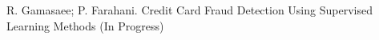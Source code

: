 





    


\begin{cvpublications}

  \cvpublication
    {R. Gamasaee; P. Farahani.} %
    {Credit Card Fraud Detection Using Supervised Learning Methods} %
    {} %
    {(In Progress)} %

\end{cvpublications}